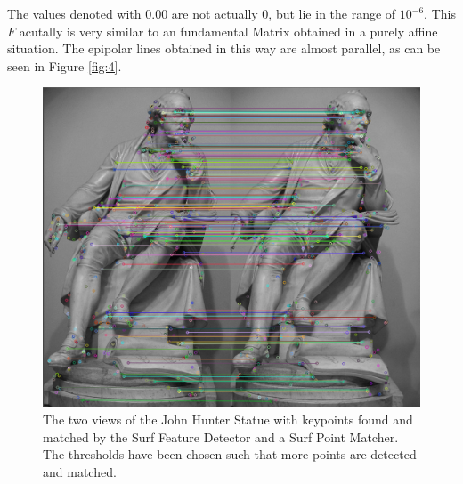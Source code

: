 \documentclass[11pt,a4paper]{article}
\begin{document}
The values denoted with $0.00$ are not actually $0$, but lie in the range of $10^{-6}$. This $F$ acutally is very similar to an fundamental Matrix obtained in a purely affine situation. The epipolar lines obtained in this way are almost parallel, as can be seen in Figure \ref{fig:4}.

\begin{figure}
\includegraphics[scale=.4]{img/matches2.png}
\caption{The two views of the John Hunter Statue with keypoints found and matched by the Surf Feature Detector and a Surf Point Matcher. The thresholds have been chosen such that more points are detected and matched.}
\label{fig:3}
\end{figure}
\end{document}
